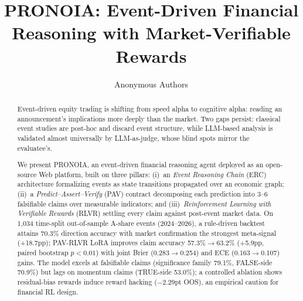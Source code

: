 \documentclass[sigconf, anonymous, review]{acmart}
\begin{document}
\title{PRONOIA: Event-Driven Financial Reasoning with Market-Verifiable Rewards}

\author{Anonymous Authors}

\renewcommand{\shortauthors}{Anonymous}

\begin{abstract}
Event-driven equity trading is shifting from speed alpha to cognitive alpha: reading an announcement's implications more deeply than the market. Two gaps persist: classical event studies are post-hoc and discard event structure, while LLM-based analysis is validated almost universally by LLM-as-judge, whose blind spots mirror the evaluatee's.

We present PRONOIA, an event-driven financial reasoning agent deployed as an open-source Web platform, built on three pillars: (i)~an \emph{Event Reasoning Chain} (ERC) architecture formalizing events as state transitions propagated over an economic graph; (ii)~a \emph{Predict--Assert--Verify} (PAV) contract decomposing each prediction into 3--6 falsifiable claims over measurable indicators; and (iii)~\emph{Reinforcement Learning with Verifiable Rewards} (RLVR) settling every claim against post-event market data. On 1,034 time-split out-of-sample A-share events (2024--2026), a rule-driven backtest attains 70.3\% direction accuracy with market confirmation the strongest meta-signal (+18.7pp); PAV-RLVR LoRA improves claim accuracy 57.3\%$\to$63.2\% (+5.9pp, paired bootstrap $p<0.01$) with joint Brier (0.283$\to$0.254) and ECE (0.163$\to$0.107) gains. The model excels at falsifiable claims (significance family 79.1\%, FALSE-side 70.9\%) but lags on momentum claims (TRUE-side 53.0\%); a controlled ablation shows residual-bias rewards induce reward hacking ($-2.29$pt OOS), an empirical caution for financial RL design.

\end{abstract}


\end{document}
